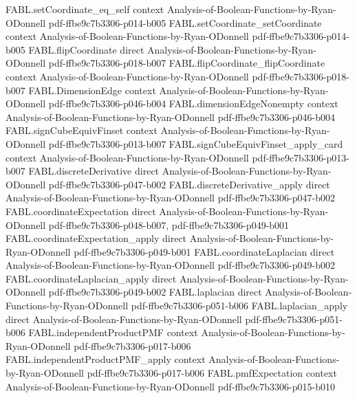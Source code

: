 \begin{theorem}
\proofstep
  {FABL.setCoordinate_eq_self}
  {context}
  {Analysis-of-Boolean-Functions-by-Ryan-ODonnell}
  {pdf-ffbe9c7b3306-p014-b005}
\proofstep
  {FABL.setCoordinate_setCoordinate}
  {context}
  {Analysis-of-Boolean-Functions-by-Ryan-ODonnell}
  {pdf-ffbe9c7b3306-p014-b005}
\proofstep
  {FABL.flipCoordinate}
  {direct}
  {Analysis-of-Boolean-Functions-by-Ryan-ODonnell}
  {pdf-ffbe9c7b3306-p018-b007}
\proofstep
  {FABL.flipCoordinate_flipCoordinate}
  {context}
  {Analysis-of-Boolean-Functions-by-Ryan-ODonnell}
  {pdf-ffbe9c7b3306-p018-b007}
\proofstep
  {FABL.DimensionEdge}
  {context}
  {Analysis-of-Boolean-Functions-by-Ryan-ODonnell}
  {pdf-ffbe9c7b3306-p046-b004}
\proofstep
  {FABL.dimensionEdgeNonempty}
  {context}
  {Analysis-of-Boolean-Functions-by-Ryan-ODonnell}
  {pdf-ffbe9c7b3306-p046-b004}
\proofstep
  {FABL.signCubeEquivFinset}
  {context}
  {Analysis-of-Boolean-Functions-by-Ryan-ODonnell}
  {pdf-ffbe9c7b3306-p013-b007}
\proofstep
  {FABL.signCubeEquivFinset_apply_card}
  {context}
  {Analysis-of-Boolean-Functions-by-Ryan-ODonnell}
  {pdf-ffbe9c7b3306-p013-b007}
\proofstep
  {FABL.discreteDerivative}
  {direct}
  {Analysis-of-Boolean-Functions-by-Ryan-ODonnell}
  {pdf-ffbe9c7b3306-p047-b002}
\proofstep
  {FABL.discreteDerivative_apply}
  {direct}
  {Analysis-of-Boolean-Functions-by-Ryan-ODonnell}
  {pdf-ffbe9c7b3306-p047-b002}
\proofstep
  {FABL.coordinateExpectation}
  {direct}
  {Analysis-of-Boolean-Functions-by-Ryan-ODonnell}
  {pdf-ffbe9c7b3306-p048-b007,
    pdf-ffbe9c7b3306-p049-b001}
\proofstep
  {FABL.coordinateExpectation_apply}
  {direct}
  {Analysis-of-Boolean-Functions-by-Ryan-ODonnell}
  {pdf-ffbe9c7b3306-p049-b001}
\proofstep
  {FABL.coordinateLaplacian}
  {direct}
  {Analysis-of-Boolean-Functions-by-Ryan-ODonnell}
  {pdf-ffbe9c7b3306-p049-b002}
\proofstep
  {FABL.coordinateLaplacian_apply}
  {direct}
  {Analysis-of-Boolean-Functions-by-Ryan-ODonnell}
  {pdf-ffbe9c7b3306-p049-b002}
\proofstep
  {FABL.laplacian}
  {direct}
  {Analysis-of-Boolean-Functions-by-Ryan-ODonnell}
  {pdf-ffbe9c7b3306-p051-b006}
\proofstep
  {FABL.laplacian_apply}
  {direct}
  {Analysis-of-Boolean-Functions-by-Ryan-ODonnell}
  {pdf-ffbe9c7b3306-p051-b006}
\proofstep
  {FABL.independentProductPMF}
  {context}
  {Analysis-of-Boolean-Functions-by-Ryan-ODonnell}
  {pdf-ffbe9c7b3306-p017-b006}
\proofstep
  {FABL.independentProductPMF_apply}
  {context}
  {Analysis-of-Boolean-Functions-by-Ryan-ODonnell}
  {pdf-ffbe9c7b3306-p017-b006}
\proofstep
  {FABL.pmfExpectation}
  {context}
  {Analysis-of-Boolean-Functions-by-Ryan-ODonnell}
  {pdf-ffbe9c7b3306-p015-b010}

\end{theorem}
